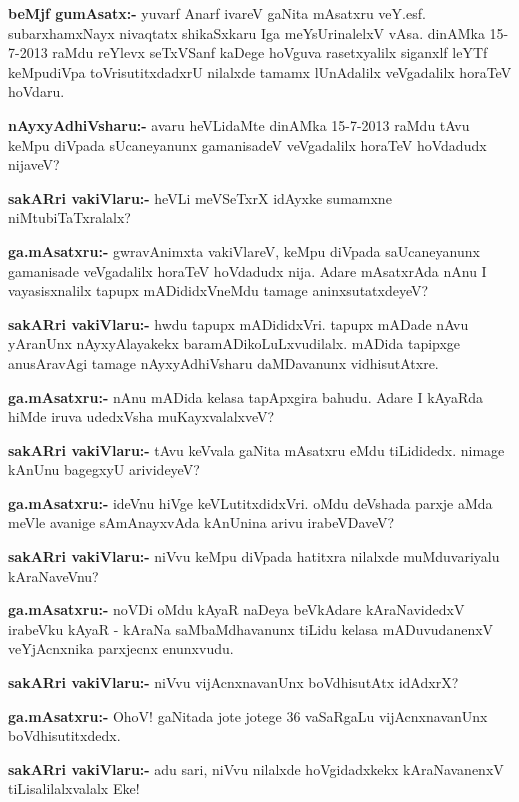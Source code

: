 \smallskip
\noindent
\textbf{beMjf gumAsatx:-} yuvarf Anarf ivareV gaNita mAsatxru veY.esf. subarxhamxNayx nivaqtatx shikaSxkaru Iga meYsUrinalelxV vAsa. dinAMka {\rm 15-7-2013} raMdu reYlevx seTxVSanf kaDege hoVguva rasetxyalilx siganxlf leYTf keMpudiVpa toVrisutitxdadxrU nilalxde tamamx lUnAdalilx veVgadalilx horaTeV hoVdaru.

\smallskip
\smallskip
\noindent
\textbf{nAyxyAdhiVsharu:-} avaru heVLidaMte dinAMka {\rm 15-7-2013} raMdu tAvu keMpu diVpada sUcaneyanunx gamanisadeV veVgadalilx horaTeV hoVdadudx nijaveV?

\smallskip
\noindent
\textbf{sakARri vakiVlaru:-} heVLi meVSeTxrX idAyxke sumamxne niMtubiTaTxralalx?

\smallskip
\noindent
\textbf{ga.mAsatxru:-} gwravAnimxta vakiVlareV, keMpu diVpada saUcaneyanunx gamanisade veVgadalilx horaTeV hoVdadudx nija. Adare mAsatxrAda nAnu I vayasisxnalilx tapupx mADididxVneMdu tamage aninxsutatxdeyeV?

\smallskip
\noindent
\textbf{sakARri vakiVlaru:-} hwdu tapupx mADididxVri. tapupx mADade nAvu yAranUnx nAyxyAlayakekx baramADikoLuLxvudilalx. mADida tapipxge anusAravAgi tamage nAyxyAdhiVsharu daMDavanunx vidhisutAtxre.

\smallskip
\noindent
\textbf{ga.mAsatxru:-} nAnu mADida kelasa tapApxgira bahudu. Adare I kAyaRda hiMde iruva udedxVsha muKayxvalalxveV?

\smallskip
\noindent
\textbf{sakARri vakiVlaru:-} tAvu keVvala gaNita mAsatxru eMdu tiLididedx. nimage kAnUnu bagegxyU arivideyeV?

\smallskip
\noindent
\textbf{ga.mAsatxru:-} ideVnu hiVge keVLutitxdidxVri. oMdu deVshada parxje aMda meVle avanige sAmAnayxvAda kAnUnina arivu irabeVDaveV?

\smallskip
\noindent
\textbf{sakARri vakiVlaru:-} niVvu keMpu diVpada hatitxra nilalxde muMduvariyalu kAraNaveVnu?

\smallskip
\noindent
\textbf{ga.mAsatxru:-} noVDi oMdu kAyaR naDeya beVkAdare kAraNavidedxV irabeVku kAyaR - kAraNa saMbaMdhavanunx tiLidu kelasa mADuvudanenxV veYjAcnxnika parxjecnx enunxvudu.

\smallskip
\noindent
\textbf{sakARri vakiVlaru:-} niVvu vijAcnxnavanUnx boVdhisutAtx idAdxrX?

\smallskip
\noindent
\textbf{ga.mAsatxru:-} OhoV! gaNitada jote jotege {\rm 36} vaSaRgaLu vijAcnxnavanUnx boVdhisutitxdedx.

\smallskip
\noindent
\textbf{sakARri vakiVlaru:-} adu sari, niVvu nilalxde hoVgidadxkekx kAraNavanenxV tiLisalilalxvalalx Eke!

